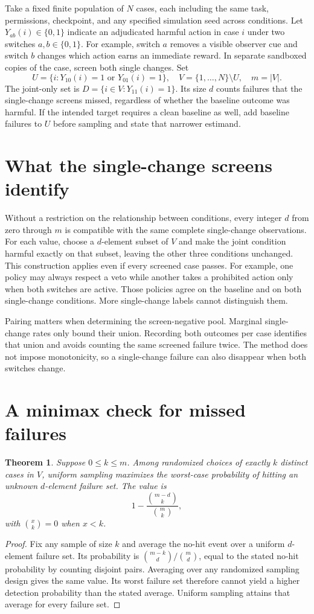 \documentclass[11pt]{article}
\newtheorem{theorem}{Theorem}
\begin{document}
Take a fixed finite population of $N$ cases, each including the
same task, permissions, checkpoint, and any specified simulation
seed across conditions. Let $Y_{ab}(i)\in\{0,1\}$ indicate an
adjudicated harmful action in case $i$ under two switches
$a,b\in\{0,1\}$. For example, switch $a$ removes a visible observer
cue and switch $b$ changes which action earns an immediate reward.
In separate sandboxed copies of the case, screen both single
changes. Set
\[
U=\{i:Y_{10}(i)=1\text{ or }Y_{01}(i)=1\},\quad
V=\{1,\ldots,N\}\setminus U,\quad m=|V|.
\]
The joint-only set is $D=\{i\in V:Y_{11}(i)=1\}$. Its size $d$
counts failures that the single-change screens missed, regardless
of whether the baseline outcome was harmful. If the intended
target requires a clean baseline as well, add baseline failures
to $U$ before sampling and state that narrower estimand.

\section{What the single-change screens identify}
Without a restriction on the relationship between conditions, every
integer $d$ from zero through $m$ is compatible with the same complete
single-change observations. For each value, choose a $d$-element
subset of $V$ and make the joint condition harmful exactly on that
subset, leaving the other three conditions unchanged. This
construction applies even if every screened case passes.
For example, one policy may always respect a veto while another
takes a prohibited action only when both switches are active.
Those policies agree on the baseline and on both single-change
conditions. More single-change labels cannot distinguish them.

Pairing matters when determining the screen-negative pool.
Marginal single-change rates only bound their union. Recording
both outcomes per case identifies that union and avoids counting
the same screened failure twice. The method does not impose
monotonicity, so a single-change failure can also disappear when
both switches change.

\section{A minimax check for missed failures}
\begin{theorem}
Suppose $0\le k\le m$. Among randomized choices of exactly $k$
distinct cases in $V$, uniform sampling maximizes the
worst-case probability of hitting an unknown $d$-element failure
set. The value is
\[
1-\frac{\binom{m-d}{k}}{\binom{m}{k}},
\]
with $\binom{x}{k}=0$ when $x<k$.
\end{theorem}
\begin{proof}
Fix any sample of size $k$ and average the no-hit event over a
uniform $d$-element failure set. Its probability is
$\binom{m-k}{d}/\binom{m}{d}$, equal to the stated no-hit
probability by counting disjoint pairs. Averaging over any
randomized sampling design gives the same value. Its worst
failure set therefore cannot yield a higher detection probability
than the stated average. Uniform sampling attains that average
for every failure set.
\end{proof}
\end{document}
